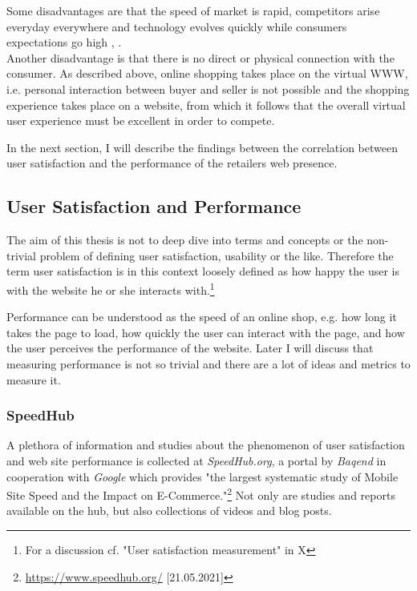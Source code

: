 Some disadvantages are that the speed of market is rapid, competitors arise everyday everywhere and technology evolves quickly while consumers expectations go high \cite{2019Hermogeno}, \cite{2020Lang}.
\\

Another disadvantage is that there is no direct or physical connection with the consumer.
As described above, online shopping takes place on the virtual WWW, i.e. personal interaction between buyer and seller is not possible and the shopping experience takes place on a website, from which it follows that the overall virtual user experience must be excellent in order to compete.

In the next section, I will describe the findings between the correlation between user satisfaction and the performance of the retailers web presence.





\subsection{User Satisfaction and Performance}

The aim of this thesis is not to deep dive into terms and concepts or the non-trivial problem of defining user satisfaction, usability or the like.
Therefore the term user satisfaction is in this context loosely defined as how happy the user is with the website he or she interacts with.\footnote{For a discussion cf. "User satisfaction measurement" in X} %

Performance can be understood as the speed of an online shop, e.g. how long it takes the page to load, how quickly the user can interact with the page, and how the user perceives the performance of the website.
Later I will discuss that measuring performance is not so trivial and there are a lot of ideas and metrics to measure it. %


\subsubsection{SpeedHub}


A plethora of information and studies about the phenomenon of user satisfaction and web site performance is collected at \textit{SpeedHub.org}, a portal by \textit{Baqend} in cooperation with \textit{Google} which provides "the largest systematic study of Mobile Site Speed and the Impact on E-Commerce."\footnote{\url{https://www.speedhub.org/} [21.05.2021]}
Not only are studies and reports available on the hub, but also collections of videos and blog posts.


